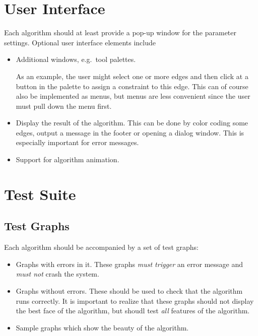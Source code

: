 \documentclass[notitlepage,twoside,fleqn]{article}
\begin{document}
\section{User Interface}

Each algorithm should at least provide a pop-up window for the
parameter settings. Optional user interface elements include

\begin{itemize}
  
  \item Additional windows, e.g.\ tool palettes.
  
  As an example, the user might select one or more edges and then
  click at a button in the palette to assign a constraint to this
  edge. This can of course also be implemented as menus, but
  menus are less convenient since the user must pull down the
  menu first.
  
  \item Display the result of the algorithm. This can be done by
  color coding some edges, output a message in the footer or
  opening a dialog window. This is especially important for error
  messages.

  \item Support for algorithm animation.

\end{itemize}


\section{Test Suite}

\subsection{Test Graphs}

Each algorithm should be accompanied by a set of test graphs:

\begin{itemize}
  
  \item Graphs with errors in it. These graphs \emph{must
    trigger} an error message and \emph{must not} crash the
  system.
  
  \item Graphs without errors. These should be used to check that
  the algorithm runs correctly. It is important to realize that
  these graphs should not display the best face of the algorithm,
  but shoudl test \emph{all} features of the algorithm.
  
  \item Sample graphs which show the beauty of the algorithm.
  
\end{itemize}
  
\end{document}
